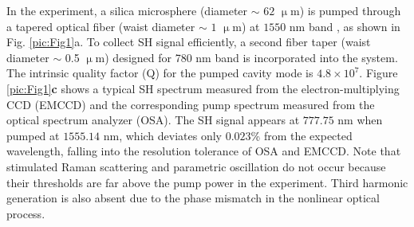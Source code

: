 \documentclass[a4paper,8pt,hyperref, twocolumn]{article}
\begin{document}
In the experiment, a silica microsphere (diameter $\sim$ $62$ $\upmu$m) 
is pumped through a tapered optical fiber (waist diameter $\sim$ $1$ $\upmu$m) at $1550$ nm band \cite{knight1997phase, cai2000observation}, as shown in Fig. \ref{pic:Fig1}a. To collect SH signal efficiently, a second fiber taper (waist diameter $\sim$ 0.5 $\upmu$m) designed for 780 nm band is incorporated into the system. The intrinsic quality factor (Q) for the pumped cavity mode is $4.8\times10^7$. %
Figure \ref{pic:Fig1}\textbf{c} shows a typical SH spectrum measured from the electron-multiplying CCD (EMCCD) and the corresponding pump spectrum measured from the optical spectrum analyzer (OSA). The SH signal appears at $777.75$ nm when pumped at $1555.14$ nm, which deviates only $0.023$\% from the expected wavelength, falling into the resolution tolerance of OSA and EMCCD.
Note that stimulated Raman scattering and parametric oscillation do not occur because their thresholds are far above the pump power in the experiment. %
Third harmonic generation is also absent due to the phase mismatch in the nonlinear optical process.
\end{document}
